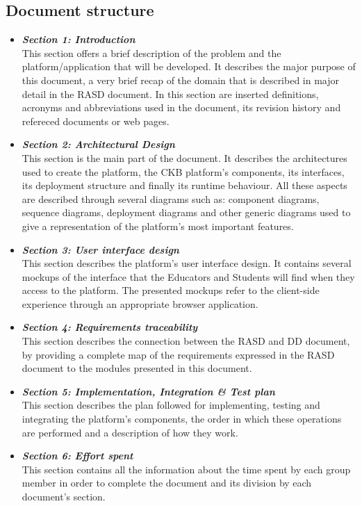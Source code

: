 \documentclass{article}
\begin{document}
{\subsection{Document structure}
\begin{itemize}
    \item \textbf{\textit{Section 1: Introduction}} \\
          This section offers a brief description of the problem and the platform/application 
          that will be developed.
          It describes the major purpose of this document, a very brief recap of the domain that 
          is described in major detail in the RASD document.
          In this section are inserted definitions, acronyms and abbreviations used 
          in the document, its revision history and refereced documents or web pages.
    \item \textbf{\textit{Section 2: Architectural Design}} \\
          This section is the main part of the document. It describes the architectures used to
          create the platform, the CKB platform's components, its interfaces, its deployment
          structure and finally its runtime behaviour.
          All these aspects are described through several diagrams such as:
          component diagrams, sequence diagrams, deployment diagrams and other
          generic diagrams used to give a representation of the platform's most important
          features.
    \item \textbf{\textit{Section 3: User interface design}} \\
          This section describes the platform's user interface design.
          It contains several mockups of the interface that the Educators and
          Students will find when they access to the platform. The presented mockups
          refer to the client-side experience through an appropriate browser application.
    \item \textbf{\textit{Section 4: Requirements traceability}} \\
          This section describes the connection between the RASD and DD document,
          by providing a complete map of the requirements expressed in the RASD document
          to the modules presented in this document.
    \item \textbf{\textit{Section 5: Implementation, Integration \& Test plan}} \\
          This section describes the plan followed for implementing, testing and
          integrating the platform's components, the order in which
          these operations are performed and a description of how they work.
    \item \textbf{\textit{Section 6: Effort spent}} \\
          This section contains all the information about the time spent by each group member
          in order to complete the document and its division by each document's section.
\end{itemize}

}
\end{document}
